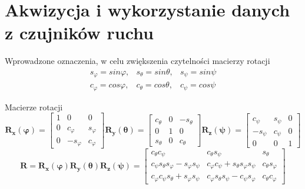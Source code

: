 \chapter{Akwizycja i wykorzystanie danych z czujników ruchu}

Wprowadzone oznaczenia, w celu zwiększenia czytelności macierzy rotacji
$$
    \begin{array}{ccc}
        s_{\varphi} = sin\varphi, & s_{\theta} = sin\theta, & s_{\psi} = sin\psi \\
        c_{\varphi} = cos\varphi, & c_{\theta} = cos\theta, & c_{\psi} = cos\psi
    \end{array}
$$

Macierze rotacji
$$
    \mathbf{R_x(\varphi)} =
    \left[
        \begin{array}{ccc}
            1 & 0 & 0 \\
            0 & c_{\varphi} & s_{\varphi} \\
            0 & -s_{\varphi} & c_{\varphi}
        \end{array}
    \right]
    \mathbf{R_y(\theta)} =
    \left[
        \begin{array}{ccc}
            c_{\theta} & 0 & -s_{\theta} \\
            0 & 1 & 0 \\
            s_{\theta} & 0 & c_{\theta}
        \end{array}
    \right]
    \mathbf{R_z(\psi)} =
    \left[
        \begin{array}{ccc}
            c_{\psi} & s_{\psi} & 0 \\
            -s_{\psi} & c_{\psi} & 0 \\
            0 & 0 & 1
        \end{array}
    \right]
$$
%
$$
    \mathbf{R} =
    \mathbf{R_x(\varphi)R_y(\theta)R_z(\psi)} =
    \left[
        \begin{array}{ccc}
            c_{\theta}c_{\psi} & c_{\theta}s_{\psi} & s_{\theta} \\
            c_{\psi}s_{\theta}s_{\varphi} - s_{\varphi}s_{\psi} & c_{\varphi}c_{\psi} + s_{\theta}s_{\varphi}s_{\psi} & c_{\theta}s_{\varphi} \\
            c_{\varphi}c_{\psi}s_{\theta} + s_{\varphi}s_{\psi} & c_{\varphi}s_{\theta}s_{\psi} - c_{\psi}s_{\varphi} & c_{\theta}c_{\varphi}
        \end{array}
    \right]
$$
